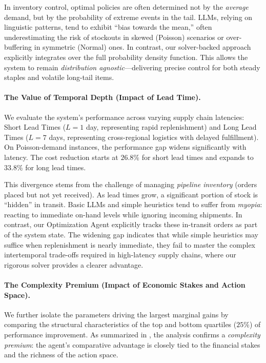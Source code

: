 \documentclass[mnsc,nonblindrev]{informs3_hide}
\begin{document}
In inventory control, optimal policies are often determined not by the \emph{average} demand, but by the probability of extreme events in the tail. LLMs, relying on linguistic patterns, tend to exhibit ``bias towards the mean,'' often underestimating the risk of stockouts in skewed (Poisson) scenarios or over-buffering in symmetric (Normal) ones. In contrast, our solver-backed approach explicitly integrates over the full probability density function. This allows the system to remain \emph{distribution agnostic}—delivering precise control for both steady staples and volatile long-tail items. \vspace{.5em}


\paragraph{The Value of Temporal Depth (Impact of Lead Time).}
We evaluate the system's performance across varying supply chain latencies: {Short Lead Times} ($L=1$ day, representing rapid replenishment) and {Long Lead Times} ($L=7$ days, representing cross-regional logistics with delayed fulfillment).
%
On Poisson-demand instances, the performance gap widens significantly with latency. The cost reduction starts at $26.8\%$ for short lead times and expands to $33.8\%$ for long lead times. 

This divergence stems from the challenge of managing \emph{pipeline inventory} (orders placed but not yet received). As lead times grow, a significant portion of stock is ``hidden'' in transit. Basic LLMs and simple heuristics tend to suffer from \emph{myopia}: reacting to immediate on-hand levels while ignoring incoming shipments. In contrast, our Optimization Agent explicitly tracks these in-transit orders as part of the system state. The widening gap indicates that while simple heuristics may suffice when replenishment is nearly immediate, they fail to master the complex intertemporal trade-offs required in high-latency supply chains, where our rigorous solver provides a clearer advantage.  \vspace{.5em}



\paragraph{The Complexity Premium (Impact of Economic Stakes and Action Space).}

We further isolate the parameters driving the largest marginal gains by comparing the structural characteristics of the top and bottom quartiles ($25\%$) of performance improvement. As summarized in , the analysis confirms a \emph{complexity premium}: the agent's comparative advantage is closely tied to the financial stakes and the richness of the action space.
\end{document}
